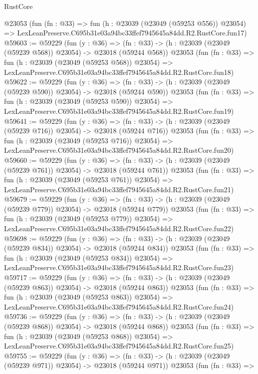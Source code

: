 \begin{lexlean}{RustCore}
\begin{coremodule}
    @23053
    (fun (fn : @33) =>
    fun (h : @23039 (@23049 (@59253 @556)) @23054) =>
    LexLeanPreserve.C695b31e03a94bc33ffef7945645a84dd.R2.RustCore.fun17)
@59603 := @59229
    (fun (y : @36) =>
    (fn : @33) -> (h : @23039 (@23049 (@59239 @568)) @23054) -> @23018 (@59244 @568))
    @23053
    (fun (fn : @33) =>
    fun (h : @23039 (@23049 (@59253 @568)) @23054) =>
    LexLeanPreserve.C695b31e03a94bc33ffef7945645a84dd.R2.RustCore.fun18)
@59622 := @59229
    (fun (y : @36) =>
    (fn : @33) -> (h : @23039 (@23049 (@59239 @590)) @23054) -> @23018 (@59244 @590))
    @23053
    (fun (fn : @33) =>
    fun (h : @23039 (@23049 (@59253 @590)) @23054) =>
    LexLeanPreserve.C695b31e03a94bc33ffef7945645a84dd.R2.RustCore.fun19)
@59641 := @59229
    (fun (y : @36) =>
    (fn : @33) -> (h : @23039 (@23049 (@59239 @716)) @23054) -> @23018 (@59244 @716))
    @23053
    (fun (fn : @33) =>
    fun (h : @23039 (@23049 (@59253 @716)) @23054) =>
    LexLeanPreserve.C695b31e03a94bc33ffef7945645a84dd.R2.RustCore.fun20)
@59660 := @59229
    (fun (y : @36) =>
    (fn : @33) -> (h : @23039 (@23049 (@59239 @761)) @23054) -> @23018 (@59244 @761))
    @23053
    (fun (fn : @33) =>
    fun (h : @23039 (@23049 (@59253 @761)) @23054) =>
    LexLeanPreserve.C695b31e03a94bc33ffef7945645a84dd.R2.RustCore.fun21)
@59679 := @59229
    (fun (y : @36) =>
    (fn : @33) -> (h : @23039 (@23049 (@59239 @779)) @23054) -> @23018 (@59244 @779))
    @23053
    (fun (fn : @33) =>
    fun (h : @23039 (@23049 (@59253 @779)) @23054) =>
    LexLeanPreserve.C695b31e03a94bc33ffef7945645a84dd.R2.RustCore.fun22)
@59698 := @59229
    (fun (y : @36) =>
    (fn : @33) -> (h : @23039 (@23049 (@59239 @834)) @23054) -> @23018 (@59244 @834))
    @23053
    (fun (fn : @33) =>
    fun (h : @23039 (@23049 (@59253 @834)) @23054) =>
    LexLeanPreserve.C695b31e03a94bc33ffef7945645a84dd.R2.RustCore.fun23)
@59717 := @59229
    (fun (y : @36) =>
    (fn : @33) -> (h : @23039 (@23049 (@59239 @863)) @23054) -> @23018 (@59244 @863))
    @23053
    (fun (fn : @33) =>
    fun (h : @23039 (@23049 (@59253 @863)) @23054) =>
    LexLeanPreserve.C695b31e03a94bc33ffef7945645a84dd.R2.RustCore.fun24)
@59736 := @59229
    (fun (y : @36) =>
    (fn : @33) -> (h : @23039 (@23049 (@59239 @868)) @23054) -> @23018 (@59244 @868))
    @23053
    (fun (fn : @33) =>
    fun (h : @23039 (@23049 (@59253 @868)) @23054) =>
    LexLeanPreserve.C695b31e03a94bc33ffef7945645a84dd.R2.RustCore.fun25)
@59755 := @59229
    (fun (y : @36) =>
    (fn : @33) -> (h : @23039 (@23049 (@59239 @971)) @23054) -> @23018 (@59244 @971))
    @23053
    (fun (fn : @33) =>

\end{coremodule}
\end{lexlean}
